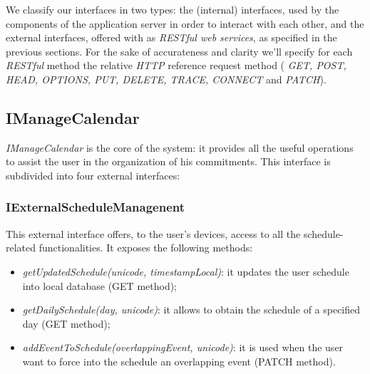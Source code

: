 We classify our interfaces in two types: the (internal) interfaces, used by the components of the application server in order to interact with each other, and the external interfaces, offered with as \textit{RESTful web services}, as specified in the previous sections. For the sake of accurateness and clarity we'll specify for each \textit{RESTful} method the relative \textit{HTTP} reference request method ( \textit{GET, POST, HEAD, OPTIONS, PUT, DELETE, TRACE, CONNECT} and \textit{PATCH}).
\subsection{IManageCalendar}
\label{subsect: IManageCalendar}
\textit{IManageCalendar} is the core of the system: it provides all the useful operations to assist the user in the organization of his commitments. This interface is subdivided into four external interfaces:

\subsubsection{IExternalScheduleManagenent}
This external interface offers, to the user's devices, access to all the schedule-related functionalities. It exposes the following methods:
\begin{itemize}
\item \textit{getUpdatedSchedule(unicode, timestampLocal)}: it updates the user schedule into local database (GET method);
\item \textit{getDailySchedule(day, unicode)}: it allows to obtain the schedule of a specified day (GET method);
\item \textit{addEventToSchedule(overlappingEvent, unicode)}: it is used when the user want to force into the schedule an overlapping event (PATCH method). 
\end{itemize}

